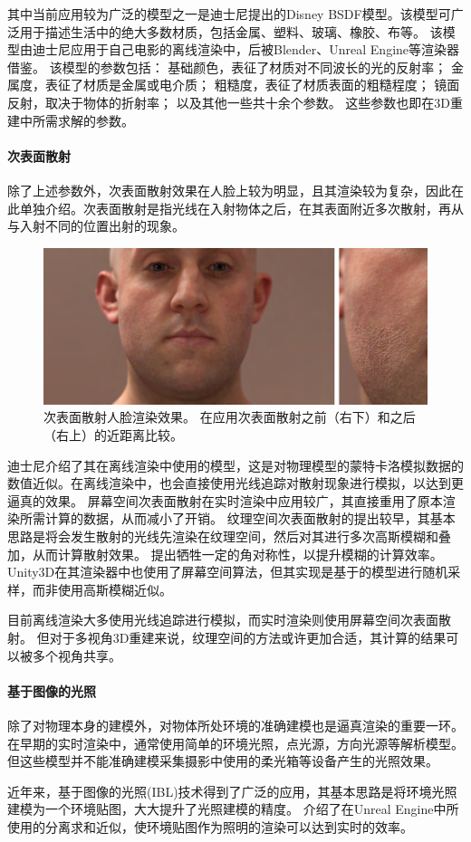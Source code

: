 其中当前应用较为广泛的模型之一是迪士尼提出的Disney BSDF模型\citep{PBR_disney}。该模型可广泛用于描述生活中的绝大多数材质，包括金属、塑料、玻璃、橡胶、布等。
该模型由迪士尼应用于自己电影的离线渲染中，后被Blender、Unreal Engine等渲染器借鉴。
该模型的参数包括：
基础颜色，表征了材质对不同波长的光的反射率；
金属度，表征了材质是金属或电介质；
粗糙度，表征了材质表面的粗糙程度；
镜面反射，取决于物体的折射率；
以及其他一些共十余个参数。
这些参数也即在3D重建中所需求解的参数。

\paragraph{次表面散射}
除了上述参数外，次表面散射效果在人脸上较为明显，且其渲染较为复杂，因此在此单独介绍。次表面散射是指光线在入射物体之后，在其表面附近多次散射，再从与入射不同的位置出射的现象。

\begin{figure}[bth]
    \centering
    \includegraphics[width=\linewidth]{figures/sss}
    \caption[次表面散射人脸渲染效果]
    {次表面散射人脸渲染效果\citep{SpSSS}。
    在应用次表面散射之前（右下）和之后（右上）的近距离比较。}
\end{figure}
迪士尼介绍了其在离线渲染中使用的模型\citep{SSS_disney}，这是对物理模型的蒙特卡洛模拟数据的数值近似。在离线渲染中，也会直接使用光线追踪对散射现象进行模拟，以达到更逼真的效果。
屏幕空间次表面散射\citep{SSSSS}在实时渲染中应用较广，其直接重用了原本渲染所需计算的数据，从而减小了开销。
纹理空间次表面散射\citep{texSSS}的提出较早，其基本思路是将会发生散射的光线先渲染在纹理空间，然后对其进行多次高斯模糊和叠加，从而计算散射效果。
\citet{SpSSS}提出牺牲一定的角对称性，以提升模糊的计算效率。
Unity3D在其渲染器中也使用了屏幕空间算法\citep{SSS_u3d}，但其实现是基于\citet{SSS_disney}的模型进行随机采样，而非使用高斯模糊近似。

目前离线渲染大多使用光线追踪进行模拟，而实时渲染则使用屏幕空间次表面散射。
但对于多视角3D重建来说，纹理空间的方法或许更加合适，其计算的结果可以被多个视角共享。

\paragraph{基于图像的光照}

除了对物理本身的建模外，对物体所处环境的准确建模也是逼真渲染的重要一环。
在早期的实时渲染中，通常使用简单的环境光照，点光源，方向光源等解析模型。
但这些模型并不能准确建模采集摄影中使用的柔光箱等设备产生的光照效果。

近年来，基于图像的光照(IBL)技术得到了广泛的应用，其基本思路是将环境光照建模为一个环境贴图，大大提升了光照建模的精度。
\citet{unreal_ssa}介绍了在Unreal Engine中所使用的分离求和近似，使环境贴图作为照明的渲染可以达到实时的效率。
